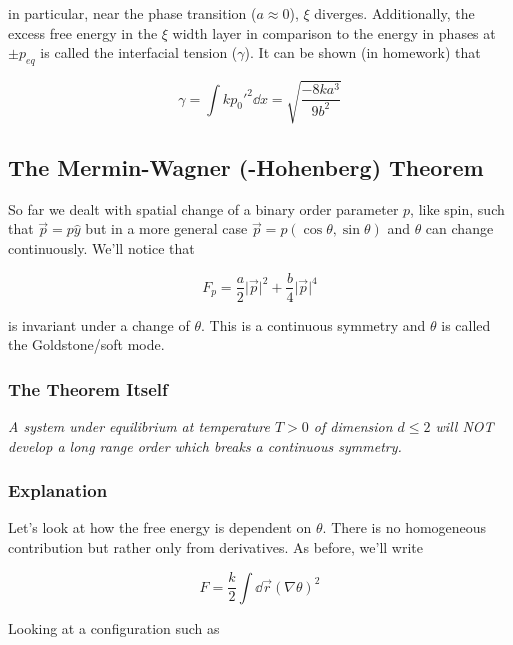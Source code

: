 in particular, near the phase transition (\(a\approx 0\)), \(\xi \) diverges. Additionally, the excess free energy in the \(\xi \) width layer in comparison to the energy in phases at \(\pm p_{eq}\) is called the interfacial tension (\(\gamma \)). It can be shown (in homework) that 

\begin{equation}
	\gamma = \int kp_0'^2\dd x = \sqrt{\frac{-8ka^3}{9b^2}}
\end{equation}

\subsection{The Mermin-Wagner (-Hohenberg) Theorem}

So far we dealt with spatial change of a binary order parameter \(p\), like spin, such that \(\vec{p} = p\hat y\) but in a more general case \(\vec{p} = p(\cos\theta,\sin\theta)\) and \(\theta \) can change continuously. We'll notice that

\begin{equation}
	F_p = \frac{a}{2}\lvert\vec p\rvert^2+\frac{b}{4}\lvert\vec p\rvert^4
\end{equation}

is invariant under a change of \(\theta \). This is a continuous symmetry and \(\theta \) is called the Goldstone/soft mode.

\subsubsection{The Theorem Itself}

\emph{A system under equilibrium at temperature \(T>0\) of dimension \(d\leq 2\) will NOT develop a long range order which breaks a continuous symmetry.}

\subsubsection{Explanation}

Let's look at how the free energy is dependent on \(\theta \). There is no homogeneous contribution but rather only from derivatives. As before, we'll write

\begin{equation}
	F = \frac{k}{2}\int \dd \vec r {(\nabla\theta)}^2
\end{equation}

Looking at a configuration such as


